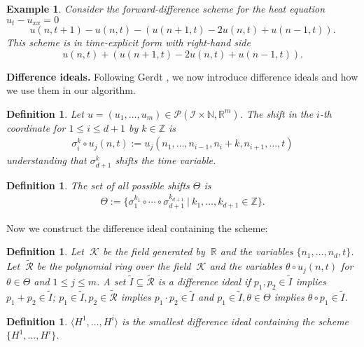 \documentclass[manuscript]{acmart}
\newcommand{\Rr}{{\mathbb{R}}}
\newcommand{\Nn}{{\mathbb{N}}}
\newcommand{\Zz}{{\mathbb{Z}}}
\newcommand{\1}{{\chi}}
\newcommand{\Ii}{{\mathcal{I}}}
\numberwithin{equation}{section}
\theoremstyle{thmlemcorr}
\numberwithin{theorem}{section}
\theoremstyle{thmlemcorr*}
\theoremstyle{defi}
\newtheorem{definition}[theorem]{Definition}
\theoremstyle{remexample}
\newtheorem{example}[theorem]{Example}
\theoremstyle{ass}
\begin{document}
\begin{example}\label{timeexplicitheateq}
	Consider the forward-difference scheme for the heat equation $u_t-u_{xx}=0$ \cite{smoller94}
	\begin{equation*}
		u(n,t+1)-u(n,t)-(u(n+1,t)-2u(n,t)+u(n-1,t)).
	\end{equation*}
	This scheme is in time-explicit form with right-hand side
	\begin{equation*}
		u(n,t)+(u(n+1,t)-2u(n,t)+u(n-1,t)).
	\end{equation*}
\end{example}
{\bf Difference ideals.}\label{diffid}
Following Gerdt \cite{gerdt12}, we now introduce difference ideals and how we use them in our algorithm.
\begin{definition}
	Let $u=(u_1,\dots,u_m)\in\mathcal{P}(\Ii\times\Nn,\Rr^m)$. The \emph{shift} in the $i$-th coordinate for $1\leq i\leq d+1$ by $k\in\Zz$ is
	\begin{gather*}
		\sigma_i^k\circ u_j(n,t):=u_j(n_1,\ldots,n_{i-1},n_i+k,n_{i+1},\ldots,t)
	\end{gather*}
	understanding that $\sigma_{d+1}^k$ shifts the time variable.
\end{definition}
\begin{definition}
	The \emph{set of all possible shifts} $\Theta$ is
	\begin{gather*}
		\Theta:=\{\sigma_1^{k_1}\circ\cdots\circ\sigma_{d+1}^{k_{d+1}}\ |\ k_1,\ldots,k_{d+1}\in\Zz\}.
	\end{gather*}
\end{definition}
Now we construct the difference ideal containing the scheme:
\begin{definition}
	\label{diffideal}
	Let $\ \mathcal{K}$ be the field generated by $\ \Rr$ and the variables $\{n_1,\ldots,n_d,t\}$. Let $\ \tilde{\mathcal{R}}$ be the polynomial ring over the field $\ \mathcal{K}$ and the variables $\theta\circ u_j(n,t)$ for $\theta\in\Theta$ and $1\leq j\leq m$.
	A set $\tilde{I}\subseteq\tilde{\mathcal{R}}$ is a \emph{difference ideal} if
	$p_1,p_2\in\tilde{I}$ implies $p_1+p_2\in\tilde{I}$;
	 $p_1\in\tilde{I},p_2\in\tilde{\mathcal{R}}$ implies $p_1\cdot p_2\in\tilde{I}$ and
	 $p_1\in\tilde{I},\theta\in\Theta$ implies $\theta\circ p_1\in\tilde{I}$.
\end{definition}
\begin{definition}
	$\langle H^1,\ldots,H^i\rangle$ is the smallest difference ideal containing the scheme $\{H^1,\ldots,H^i\}$.
\end{definition}
\end{document}
